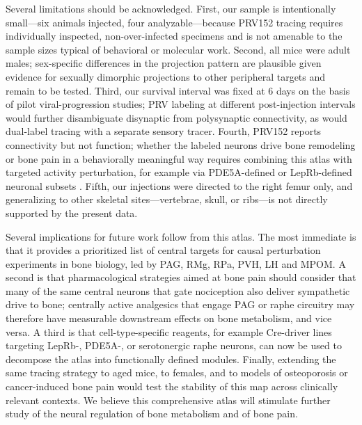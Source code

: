 \documentclass[11pt]{article}
\begin{document}
Several limitations should be acknowledged. First, our sample is intentionally small---six animals injected, four analyzable---because PRV152 tracing requires individually inspected, non-over-infected specimens and is not amenable to the sample sizes typical of behavioral or molecular work. Second, all mice were adult males; sex-specific differences in the projection pattern are plausible given evidence for sexually dimorphic projections to other peripheral targets \citep{adler2012neurochemical} and remain to be tested. Third, our survival interval was fixed at 6 days on the basis of pilot viral-progression studies; PRV labeling at different post-injection intervals would further disambiguate disynaptic from polysynaptic connectivity, as would dual-label tracing with a separate sensory tracer. Fourth, PRV152 reports connectivity but not function; whether the labeled neurons drive bone remodeling or bone pain in a behaviorally meaningful way requires combining this atlas with targeted activity perturbation, for example via PDE5A-defined or LepRb-defined neuronal subsets \citep{kim2020pde5a,flak2016cns}. Fifth, our injections were directed to the right femur only, and generalizing to other skeletal sites---vertebrae, skull, or ribs---is not directly supported by the present data.

Several implications for future work follow from this atlas. The most immediate is that it provides a prioritized list of central targets for causal perturbation experiments in bone biology, led by PAG, RMg, RPa, PVH, LH and MPOM. A second is that pharmacological strategies aimed at bone pain should consider that many of the same central neurons that gate nociception also deliver sympathetic drive to bone; centrally active analgesics that engage PAG or raphe circuitry may therefore have measurable downstream effects on bone metabolism, and vice versa. A third is that cell-type-specific reagents, for example Cre-driver lines targeting LepRb-, PDE5A-, or serotonergic raphe neurons, can now be used to decompose the atlas into functionally defined modules. Finally, extending the same tracing strategy to aged mice, to females, and to models of osteoporosis or cancer-induced bone pain would test the stability of this map across clinically relevant contexts. We believe this comprehensive atlas will stimulate further study of the neural regulation of bone metabolism and of bone pain.



\end{document}
